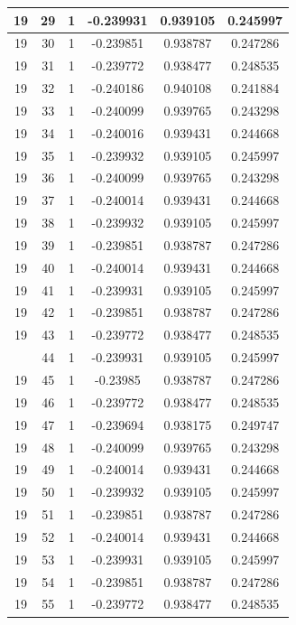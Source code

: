 \documentclass[12pt,a4paper]{article}
\numberwithin{equation}{section}
\numberwithin{figure}{section}
\numberwithin{table}{section}
\begin{document}
\begin{longtable}{|c|c|c|c|c|c|}
19 & 29 & 1 & -0.239931 & 0.939105 & 0.245997 \\ \hline
19 & 30 & 1 & -0.239851 & 0.938787 & 0.247286 \\ \hline
19 & 31 & 1 & -0.239772 & 0.938477 & 0.248535 \\ \hline
19 & 32 & 1 & -0.240186 & 0.940108 & 0.241884 \\ \hline
19 & 33 & 1 & -0.240099 & 0.939765 & 0.243298 \\ \hline
19 & 34 & 1 & -0.240016 & 0.939431 & 0.244668 \\ \hline
19 & 35 & 1 & -0.239932 & 0.939105 & 0.245997 \\ \hline
19 & 36 & 1 & -0.240099 & 0.939765 & 0.243298 \\ \hline
19 & 37 & 1 & -0.240014 & 0.939431 & 0.244668 \\ \hline
19 & 38 & 1 & -0.239932 & 0.939105 & 0.245997 \\ \hline
19 & 39 & 1 & -0.239851 & 0.938787 & 0.247286 \\ \hline
19 & 40 & 1 & -0.240014 & 0.939431 & 0.244668 \\ \hline
19 & 41 & 1 & -0.239931 & 0.939105 & 0.245997 \\ \hline
19 & 42 & 1 & -0.239851 & 0.938787 & 0.247286 \\ \hline
19 & 43 & 1 & -0.239772 & 0.938477 & 0.248535 \\ \hline
\pagebreak
19 & 44 & 1 & -0.239931 & 0.939105 & 0.245997 \\ \hline
19 & 45 & 1 & -0.23985 & 0.938787 & 0.247286 \\ \hline
19 & 46 & 1 & -0.239772 & 0.938477 & 0.248535 \\ \hline
19 & 47 & 1 & -0.239694 & 0.938175 & 0.249747 \\ \hline
19 & 48 & 1 & -0.240099 & 0.939765 & 0.243298 \\ \hline
19 & 49 & 1 & -0.240014 & 0.939431 & 0.244668 \\ \hline
19 & 50 & 1 & -0.239932 & 0.939105 & 0.245997 \\ \hline
19 & 51 & 1 & -0.239851 & 0.938787 & 0.247286 \\ \hline
19 & 52 & 1 & -0.240014 & 0.939431 & 0.244668 \\ \hline
19 & 53 & 1 & -0.239931 & 0.939105 & 0.245997 \\ \hline
19 & 54 & 1 & -0.239851 & 0.938787 & 0.247286 \\ \hline
19 & 55 & 1 & -0.239772 & 0.938477 & 0.248535 \\ \hline

\end{longtable}
\end{document}
